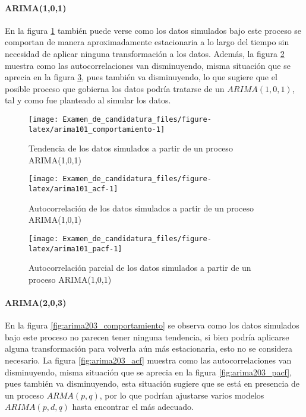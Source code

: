 \documentclass[
]{article}
\begin{document}
\paragraph{ARIMA(1,0,1)}

En la figura \ref{fig:arima101_comportamiento} también puede verse como
los datos simulados bajo este proceso se comportan de manera
aproximadamente estacionaria a lo largo del tiempo sin necesidad de
aplicar ninguna transformación a los datos. Además, la figura
\ref{fig:arima101_acf} muestra como las autocorrelaciones van
disminuyendo, misma situación que se aprecia en la figura
\ref{fig:arima101_pacf}, pues también va disminuyendo, lo que sugiere
que el posible proceso que gobierna los datos podría tratarse de un
\(ARIMA(1,0,1)\), tal y como fue planteado al simular los datos.

\begin{figure}[H]
\texttt{[image: Examen\_de\_candidatura\_files/figure-latex/arima101\_comportamiento-1]} \caption{Tendencia de los datos simulados a partir de un proceso ARIMA(1,0,1)}\label{fig:arima101_comportamiento}
\end{figure}

\begin{figure}[H]
\texttt{[image: Examen\_de\_candidatura\_files/figure-latex/arima101\_acf-1]} \caption{Autocorrelación de los datos simulados a partir de un proceso ARIMA(1,0,1)}\label{fig:arima101_acf}
\end{figure}

\begin{figure}[H]
\texttt{[image: Examen\_de\_candidatura\_files/figure-latex/arima101\_pacf-1]} \caption{Autocorrelación parcial de los datos simulados a partir de un proceso ARIMA(1,0,1)}\label{fig:arima101_pacf}
\end{figure}

\paragraph{ARIMA(2,0,3)}

En la figura \ref{fig:arima203_comportamiento} se observa como los datos
simulados bajo este proceso no parecen tener ninguna tendencia, si bien
podría aplicarse alguna transformación para volverla aún más
estacionaria, esto no se considera necesario. La figura
\ref{fig:arima203_acf} muestra como las autocorrelaciones van
disminuyendo, misma situación que se aprecia en la figura
\ref{fig:arima203_pacf}, pues también va disminuyendo, esta situación
sugiere que se está en presencia de un proceso \(ARMA(p,q)\), por lo que
podrían ajustarse varios modelos \(ARIMA(p,d,q)\) hasta encontrar el más
adecuado.
\end{document}
